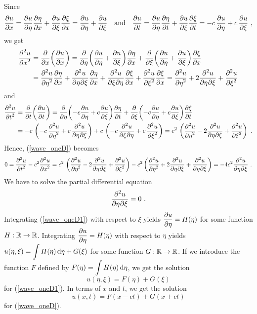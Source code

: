Since
\[
\pdydx{u}{x} = \pdydx{u}{\eta}\pdydx{\eta}{x} + \pdydx{u}{\xi}\pdydx{\xi}{x}
= \pdydx{u}{\eta} + \pdydx{u}{\xi}
\quad \text{and} \quad
\pdydx{u}{t} = \pdydx{u}{\eta}\pdydx{\eta}{t} + \pdydx{u}{\xi}\pdydx{\xi}{t}
= -c\, \pdydx{u}{\eta} +c\, \pdydx{u}{\xi} \ ,
\]
we get
\begin{align*}
\pdydxn{u}{x}{2} &= \pdfdx{\left(\pdydx{u}{x}\right)}{x}
= \pdfdx{\left(\pdydx{u}{\eta} + \pdydx{u}{\xi}\right)}{\eta} \pdydx{\eta}{x}
+ \pdfdx{\left(\pdydx{u}{\eta} + \pdydx{u}{\xi}\right)}{\xi} \pdydx{\xi}{x}\\
&= \pdydxn{u}{\eta}{2}\pdydx{\eta}{x} +
\pdydxnm{u}{\eta}{\xi}{2}{}{}\pdydx{\eta}{x} +
\pdydxnm{u}{\xi}{\eta}{2}{}{}\pdydx{\xi}{x} +
\pdydxn{u}{\xi}{2}\pdydx{\xi}{x}
= \pdydxn{u}{\eta}{2} + 2\pdydxnm{u}{\eta}{\xi}{2}{}{} +
\pdydxn{u}{\xi}{2}
\end{align*}
and
\begin{align*}
\pdydxn{u}{t}{2} &= \pdfdx{\left(\pdydx{u}{t}\right)}{t}
= \pdfdx{\left(-c\pdydx{u}{\eta} + c\pdydx{u}{\xi}\right)}{\eta}\pdydx{\eta}{t}
+ \pdfdx{\left(-c\pdydx{u}{\eta} + c\pdydx{u}{\xi}\right)}{\xi}\pdydx{\xi}{t}\\
&= -c\,\left( -c\, \pdydxn{u}{\eta}{2}
   + c\,\pdydxnm{u}{\eta}{\xi}{2}{}{}\right) +
c\, \left( -c \,\pdydxnm{u}{\xi}{\eta}{2}{}{} + c\,\pdydxn{u}{\xi}{2} 
\right)
= c^2\,\left(\pdydxn{u}{\eta}{2} - 2\pdydxnm{u}{\eta}{\xi}{2}{}{}
+ \pdydxn{u}{\xi}{2} \right) \ .
\end{align*}
Hence, (\ref{wave_oneD}) becomes
\[
0 = \pdydxn{u}{t}{2} - c^2 \pdydxn{u}{x}{2} =
c^2\,\left(\pdydxn{u}{\eta}{2} - 2\pdydxnm{u}{\eta}{\xi}{2}{}{}
+ \pdydxn{u}{\xi}{2} \right) - c^2 \left(
\pdydxn{u}{\eta}{2} + 2\pdydxnm{u}{\eta}{\xi}{2}{}{} +
\pdydxnm{u}{\eta}{\xi}{2}{}{} \right)
= -4c^2 \pdydxnm{u}{\eta}{\xi}{2}{}{} \ .
\]
We have to solve the partial differential equation
\begin{equation} \label{wave_oneD1}
\pdydxnm{u}{\eta}{\xi}{2}{}{} = 0 \ .
\end{equation}
Integrating (\ref{wave_oneD1}) with
respect to $\xi$ yields $\displaystyle \pdydx{u}{\eta} = H(\eta)$ for
some function $H:\RR\rightarrow \RR$.  Integrating
$\displaystyle \pdydx{u}{\eta} = H(\eta)$ with respect to $\eta$ yields
$\displaystyle u(\eta,\xi) = \int H(\eta) \dx{\eta} + G(\xi)$ for some
function $G:\RR\rightarrow \RR$.  If we introduce the function $F$
defined by
$\displaystyle F(\eta) = \int H(\eta) \dx{\eta}$, we get the solution
\[
u(\eta,\xi) = F(\eta) + G(\xi)
\]
for (\ref{wave_oneD1}).  In terms of $x$ and $t$, we get the solution
\begin{equation} \label{wave_oneD1uFG}
u(x,t) = F(x-ct) + G(x+ct)
\end{equation}
for (\ref{wave_oneD}).


